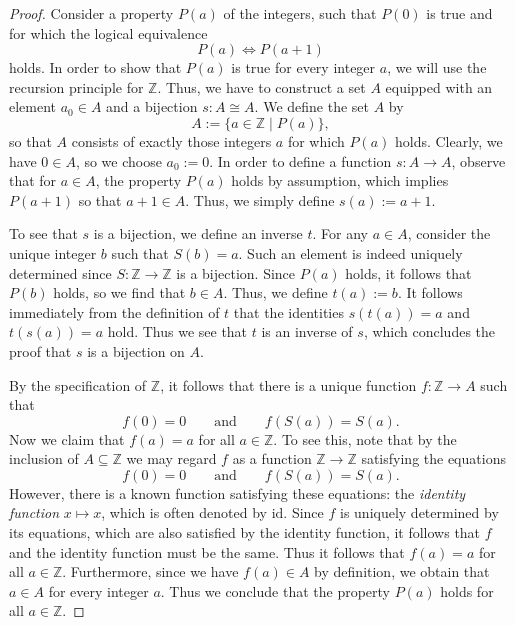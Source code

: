 \begin{proof}
  Consider a property $P(a)$ of the integers, such that $P(0)$ is true and for which the logical equivalence
  \begin{equation*}
    P(a)\Leftrightarrow P(a+1)
  \end{equation*}
  holds. In order to show that $P(a)$ is true for every integer $a$, we will use the recursion principle for $\mathbb{Z}$. Thus, we have to construct a set $A$ equipped with an element $a_0\in A$ and a bijection $s:A\cong A$. We define the set $A$ by
  \begin{equation*}
    A := \{a\in\mathbb{Z}\mid P(a)\},
  \end{equation*}
  so that $A$ consists of exactly those integers $a$ for which $P(a)$ holds. Clearly, we have $0\in A$, so we choose $a_0:=0$. In order to define a function $s:A\to A$, observe that for $a\in A$, the property $P(a)$ holds by assumption, which implies $P(a+1)$ so that $a+1\in A$. Thus, we simply define $s(a):=a+1$.

  To see that $s$ is a bijection, we define an inverse $t$. For any $a\in A$, consider the unique integer $b$ such that $S(b)=a$. Such an element is indeed uniquely determined since $S:\mathbb{Z}\to\mathbb{Z}$ is a bijection. Since $P(a)$ holds, it follows that $P(b)$ holds, so we find that $b\in A$. Thus, we define $t(a):=b$. It follows immediately from the definition of $t$ that the identities $s(t(a))=a$ and $t(s(a))=a$ hold. Thus we see that $t$ is an inverse of $s$, which concludes the proof that $s$ is a bijection on $A$.

  By the specification of $\mathbb{Z}$, it follows that there is a unique function $f:\mathbb{Z}\to A$ such that
  \begin{equation*}
    f(0)=0\qquad\text{and}\qquad f(S(a))=S(a).
  \end{equation*}
  Now we claim that $f(a)=a$ for all $a\in\mathbb{Z}$. To see this, note that by the inclusion of $A\subseteq \mathbb{Z}$ we may regard $f$ as a function $\mathbb{Z}\to\mathbb{Z}$ satisfying the equations
  \begin{equation*}
    f(0)=0\qquad\text{and}\qquad f(S(a))=S(a).
  \end{equation*}
  However, there is a known function satisfying these equations: the \emph{identity function} $x\mapsto x$, which is often denoted by $\mathrm{id}$. Since $f$ is uniquely determined by its equations, which are also satisfied by the identity function, it follows that $f$ and the identity function must be the same. Thus it follows that $f(a)=a$ for all $a\in\mathbb{Z}$. Furthermore, since we have $f(a)\in A$ by definition, we obtain that $a\in A$ for every integer $a$. Thus we conclude that the property $P(a)$ holds for all $a\in\mathbb{Z}$.
\end{proof}

